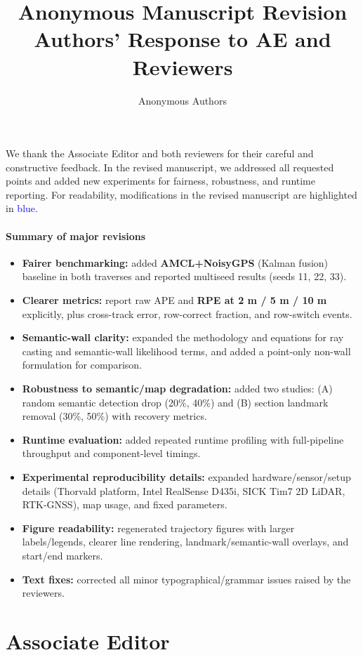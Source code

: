 \documentclass[a4paper]{article}
\title{
  \textbf{Anonymous Manuscript Revision}
  \\[\baselineskip] Authors' Response to AE and Reviewers
}
\author{Anonymous Authors}
\newcounter{todonum}
\newcommand\resettodonum{\setcounter{todonum}{0}}
\newcommand{\reviewed}[1]{\textcolor{blue}{#1}}
\begin{document}
\maketitle
\resettodonum

We thank the Associate Editor and both reviewers for their careful and constructive feedback.
In the revised manuscript, we addressed all requested points and added new experiments for fairness,
robustness, and runtime reporting.
For readability, modifications in the revised manuscript are highlighted in \reviewed{blue}.

\paragraph{Summary of major revisions}
\begin{itemize}
  \item \textbf{Fairer benchmarking:} added \textbf{AMCL+NoisyGPS} (Kalman fusion) baseline in both traverses and reported multiseed results (seeds 11, 22, 33).
  \item \textbf{Clearer metrics:} report raw APE and \textbf{RPE at 2 m / 5 m / 10 m} explicitly, plus cross-track error, row-correct fraction, and row-switch events.
  \item \textbf{Semantic-wall clarity:} expanded the methodology and equations for ray casting and semantic-wall likelihood terms, and added a point-only non-wall formulation for comparison.
  \item \textbf{Robustness to semantic/map degradation:} added two studies: (A) random semantic detection drop (20\%, 40\%) and (B) section landmark removal (30\%, 50\%) with recovery metrics.
  \item \textbf{Runtime evaluation:} added repeated runtime profiling with full-pipeline throughput and component-level timings.
  \item \textbf{Experimental reproducibility details:} expanded hardware/sensor/setup details (Thorvald platform, Intel RealSense D435i, SICK Tim7 2D LiDAR, RTK-GNSS), map usage, and fixed parameters.
  \item \textbf{Figure readability:} regenerated trajectory figures with larger labels/legends, clearer line rendering, landmark/semantic-wall overlays, and start/end markers.
  \item \textbf{Text fixes:} corrected all minor typographical/grammar issues raised by the reviewers.
\end{itemize}

\section*{Associate Editor}
\end{document}
